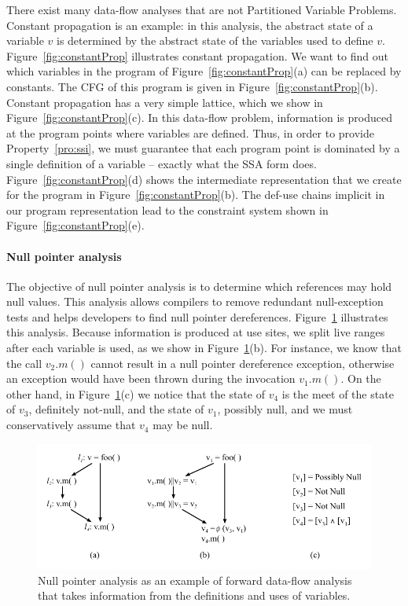 There exist many data-flow analyses that are not Partitioned Variable Problems.
Constant propagation is an example:
in this analysis, the abstract state of a variable $v$ is determined by the abstract state of the variables used to define $v$.
Figure~\ref{fig:constantProp} illustrates constant propagation.
We want to find out which variables in the program of Figure~\ref{fig:constantProp}(a) can be replaced by constants.
The CFG of this program is given in Figure~\ref{fig:constantProp}(b).
Constant propagation has a very simple lattice, which we show in Figure~\ref{fig:constantProp}(c).
In this data-flow problem, information is produced at the program points where variables are defined.
Thus, in order to provide Property~\ref{pro:ssi}, we must guarantee that each program point is dominated by a single definition of a variable -- exactly what the SSA form does.
Figure~\ref{fig:constantProp}(d) shows the intermediate representation that we create for the program in Figure~\ref{fig:constantProp}(b).
The def-use chains implicit in our program representation lead 
to the constraint system shown in Figure~\ref{fig:constantProp}(e).

\paragraph{Null pointer analysis} The objective of null pointer analysis is to determine which references may hold null values.
This analysis allows compilers to remove redundant null-exception tests and helps developers to find null pointer dereferences.
Figure~\ref{fig:nullAnalysis} illustrates this analysis.
Because information is produced at use sites, we split live ranges after each variable is used, as we show in Figure~\ref{fig:nullAnalysis}(b).
For instance, we know that the call $v_2.m()$ cannot result in a null pointer dereference exception, otherwise an exception would have been thrown during the invocation $v_1.m()$.
On the other hand, in Figure~\ref{fig:nullAnalysis}(c) we notice that the state of $v_4$ is the meet of the state of $v_3$, definitely not-null, and the state of $v_1$, possibly null, and we must conservatively assume that $v_4$ may be null.


\begin{figure}[t!]
\centering
\includegraphics[width=\linewidth]{nullAnalysis}
\caption{Null pointer analysis as an example of forward data-flow analysis that takes information from the definitions and uses of variables.} \label{fig:nullAnalysis}
\end{figure}


